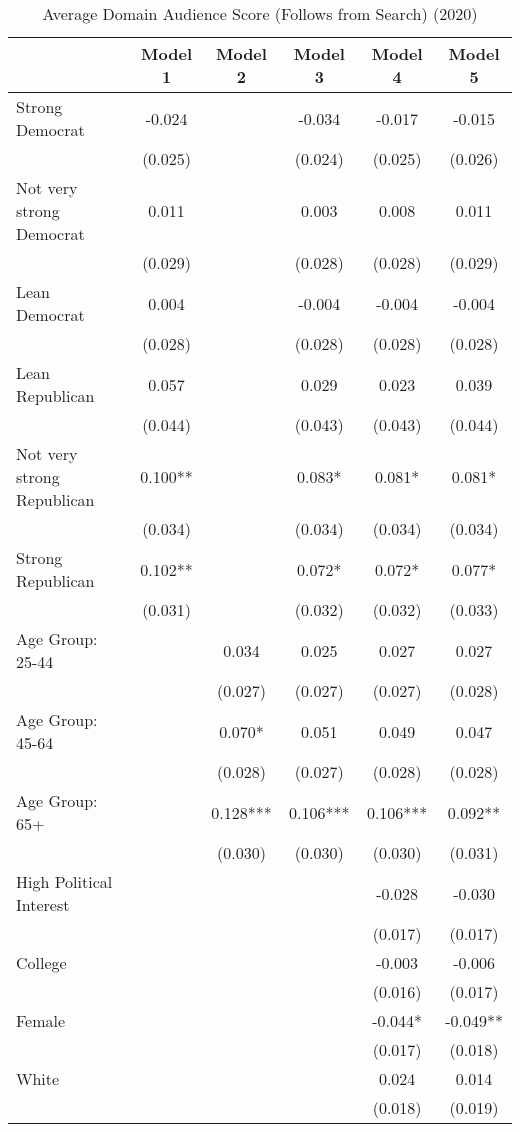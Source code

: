 \begin{table}

\caption{Average Domain Audience Score (Follows from Search) (2020)}
\centering
\begin{tabular}[t]{lccccc}
\toprule
  & Model 1 & Model 2 & Model 3 & Model 4 & Model 5\\
\midrule
Strong Democrat & -0.024 &  & -0.034 & -0.017 & -0.015\\
 & (0.025) &  & (0.024) & (0.025) & (0.026)\\
Not very strong Democrat & 0.011 &  & 0.003 & 0.008 & 0.011\\
 & (0.029) &  & (0.028) & (0.028) & (0.029)\\
Lean Democrat & 0.004 &  & -0.004 & -0.004 & -0.004\\
 & (0.028) &  & (0.028) & (0.028) & (0.028)\\
Lean Republican & 0.057 &  & 0.029 & 0.023 & 0.039\\
 & (0.044) &  & (0.043) & (0.043) & (0.044)\\
Not very strong Republican & 0.100** &  & 0.083* & 0.081* & 0.081*\\
 & (0.034) &  & (0.034) & (0.034) & (0.034)\\
Strong Republican & 0.102** &  & 0.072* & 0.072* & 0.077*\\
 & (0.031) &  & (0.032) & (0.032) & (0.033)\\
Age Group: 25-44 &  & 0.034 & 0.025 & 0.027 & 0.027\\
 &  & (0.027) & (0.027) & (0.027) & (0.028)\\
Age Group: 45-64 &  & 0.070* & 0.051 & 0.049 & 0.047\\
 &  & (0.028) & (0.027) & (0.028) & (0.028)\\
Age Group: 65+ &  & 0.128*** & 0.106*** & 0.106*** & 0.092**\\
 &  & (0.030) & (0.030) & (0.030) & (0.031)\\
High Political Interest &  &  &  & -0.028 & -0.030\\
 &  &  &  & (0.017) & (0.017)\\
College &  &  &  & -0.003 & -0.006\\
 &  &  &  & (0.016) & (0.017)\\
Female &  &  &  & -0.044* & -0.049**\\
 &  &  &  & (0.017) & (0.018)\\
White &  &  &  & 0.024 & 0.014\\
 &  &  &  & (0.018) & (0.019)\\

\end{tabular}
\end{table}
